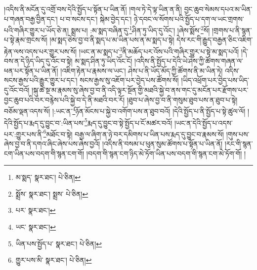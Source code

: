 །འདིས་ནི་མངོན་དུ་འགྲོ་བས་དེའི་སྤྱོད་པ་སྟོན་པ་ཡིན་ནོ། །གལ་ཏེ་དེ་ལྟ་ཡིན་ན་ནི། བྱང་ཆུབ་སེམས་དཔའ་མ་ཡིན་པ་གཞན་བརྒྱ་བྱིན་དང་། པ་བ་སངས་དང་། སྐེམ་བྱེད་དང་། ཉེ་དབང་ལ་སོགས་པའི་སྤྱོད་པ་དག་ལ་ཡང་གྲགས་པའི་གཞིར་གྱུར་པ་ཡོད་ཅེ་ན། སྨྲས་པ། :མ་སྨད་བཞིན་དུ་\footnote{མ་སྨད་  སྣར་ཐང་།  པེ་ཅིན། }ཤིན་ཏུ་ཡིད་དུ་འོང་། །ཞེས་སྨོས་\footnote{སྨྲོས་  སྣར་ཐང་། སྨྲས་  པེ་ཅིན། }སོ། །གྲགས་པ་ནི་སྙན་པ་སྟེ་རྣམ་གྲངས་སོ། །མ་སྨད་ཅེས་བྱ་བ་ནི་སྨད་པ་མ་ཡིན་པས་ན་མ་སྨད་པ་སྟེ། དེས་རང་གི་རྒྱུད་བརྒྱན་ཅིང་འཇིག་རྟེན་ལས་འདས་པར་གྱུར་པས་སོ། །ཡང་ན་མ་སྨད་པ་\footnote{པར་  སྣར་ཐང་། }ནི་མཆོད་པར་འོས་པའི་གཞིར་གྱུར་པ་སྟེ་མ་སྨད་པའོ། །དེ་བས་ན་དེ་ཉིད་ཡིད་དུ་འོང་བ་སྟེ། མ་སྨད་ཤིན་ཏུ་ཡིད་འོང་ངོ། །འདིས་ནི་སྤྱོད་པ་དེའི་ཡེ་ཤེས་ཀྱི་ཚོགས་གཞན་ལ་ཕན་པར་སྟོན་པ་ཡིན་ནོ། །འཇིག་རྟེན་པ་རྣམས་ལ་ཡང་། ཤེས་པ་ནི་ཡོད་མོད་ཀྱི་ཚོགས་ནི་མ་ཡིན་ཏེ། འདིས་སངས་རྒྱས་པའི་རྒྱུར་གྱུར་པ་དང་། སངས་རྒྱས་སུ་འཇོག་པར་བྱེད་པས་ཚོགས་སོ། །ཡིད་འཕྲོག་པར་བྱེད་པས་ཡིད་དུ་འོང་བའོ། །སྐུ་ཚེ་སྔ་མ་རྣམས་སུ་ཞེས་བྱ་བ་ནི་འདི་ལྟར་སྔོན་གྱི་མཐའི་སྐྱེ་བ་ནས་གང་དུ་མངོན་པར་རྫོགས་པར་བྱང་ཆུབ་པའི་བར་བརྙེས་པའི་སྐྱེ་བ་དེ་ནི་མཐའི་བར་རོ། །ཐུབ་པ་ཞེས་བྱ་བ་ནི་གསུམ་ཐུབ་པས་ན་ཐུབ་པ་སྟེ། བཅོམ་ལྡན་འདས་སོ། །:ཡང་ན་\footnote{ཡང་  སྣར་ཐང་། }ཉོན་མོངས་པ་སྐྱེ་བ་འགོག་པས་ན་ཐུབ་བའོ། །དེའི་སྤྱོད་པ་ནི་སྤྱོད་པ་སྟེ་ཚུལ་ལོ། །དེའི་སྤྱོད་པ་རྨད་དུ་བྱུང་བ་:ཡིན་པས་\footnote{ཡིན་པས་སྤྱོད་པ་  སྣར་ཐང་།  པེ་ཅིན། }རྨད་དུ་བྱུང་བ་སྟེ་སྤྱོད་པ་ངོ་མཚར་བའོ། །ཡང་ན་དེའི་སྤྱོད་པ་འདས་པར་:གྱུར་པས་ནི་\footnote{གྱུར་པས་མི་  སྣར་ཐང་།  པེ་ཅིན། }མཐོང་བ་སྟེ། བརྒྱ་ལ་ཞིག་ན་ཉེ་བར་དམིགས་པ་ཡིན་པས་རྨད་དུ་བྱུང་བ་རྣམས་སོ། །གུས་པས་ཞེས་བྱ་བ་ནི་དགའ་ཞིང་ཞེས་པས་ཞེས་བྱའོ། །འདིས་ནི་བསམ་པ་ཕུན་སུམ་ཚོགས་པ་སྟོན་པ་ཡིན་ནོ། །རང་གི་སྙན་ངག་ཡིན་པས་བདག་གི་སྙན་ངག་གོ། །བདག་གི་སྙན་ངག་ཉིད་མེ་ཏོག་ཡིན་པས་བདག་གི་སྙན་ངག་མེ་ཏོག་གོ། །
